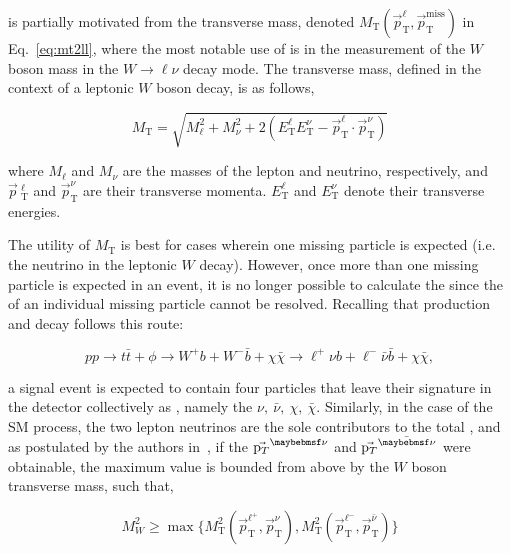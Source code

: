 \mttll is partially motivated from the transverse mass, denoted $M_{\text{T}}\left(\vec{p}^{\ell}_{\text{T}},\vec{p}^{\text{miss}}_{\text{T}}\right)$ in Eq.~\ref{eq:mt2ll}, where the most notable use of \mt is in the measurement of the $W$ boson mass in the $W\rightarrow\ell\nu$ decay mode. The transverse mass, defined in the context of a leptonic $W$ boson decay, is as follows,

\begin{equation}
  M_{\text{T}} = \sqrt{M_{\ell}^{2} + M_{\nu}^{2} + 2(E_{\text{T}}^{\ell}E_{\text{T}}^{\nu} - \vec{p}_{\text{T}}^{\ell}\cdot\vec{p}_{\text{T}}^{\nu})}
\end{equation}

where $M_{\ell}$ and $M_{\nu}$ are the masses of the lepton and neutrino, respectively, and $\vec{p}\
_{\text{T}}^{\ell}$ and $\vec{p}_{\text{T}}^{\nu}$ are their transverse momenta. $E_{\text{T}}^{\ell}$ and $E_{\text{T}}^{\nu}$ denote their transverse energies. 

The utility of $M_{\text{T}}$ is best for cases wherein one missing particle is expected (i.e. the neutrino in the leptonic $W$ decay). However, once more than one missing particle is expected in an event, it is no longer possible to calculate the \mt since the \pt of an individual missing particle cannot be resolved. Recalling that \ttDM production and decay follows this route:

\begin{equation}
pp \rightarrow t\bar{t} + \phi \rightarrow W^{+} b + W^{-} \bar{b} + \chi\bar{\chi} \rightarrow \ell^{+} \nu b + \ell^{-} \bar{\nu} \bar{b} + \chi\bar{\chi},
\end{equation}

a signal event is expected to contain four particles that leave their signature in the detector collectively as \ptmiss, namely the $\nu,\:\bar{\nu},\:\chi,\:\bar{\chi}$. Similarly, in the case of the SM \ttll process, the two lepton neutrinos are the sole contributors to the total \ptvecmiss, and as postulated by the authors in~\cite{Lester:1999tx}, if the $\vec{\pt}^{\nu}$ and $\vec{\pt}^{\bar{\nu}}$ were obtainable, the maximum \mt value is bounded from above by the $W$ boson transverse mass, such that,

\begin{equation}
  M_{W}^{2} \geq \max{\{M_{\text{T}}^{2}\left(\vec{p}^{\ell^{+}}_{\text{T}}, \vec{p}^{\nu}_{\text{T}}\right), M_{\text{T}}^{2}\left(\vec{p}^{\ell^{-}}_{\text{T}}, \vec{p}^{\bar{\nu}}_{\text{T}}\right)\}}
\end{equation} 

